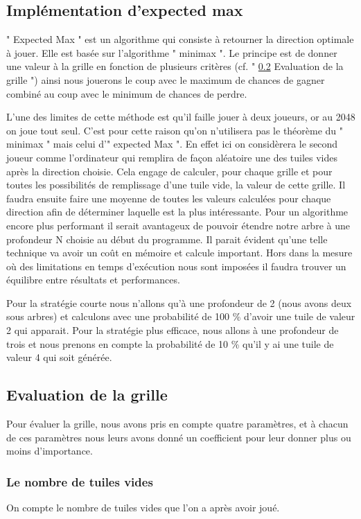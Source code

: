 \documentclass[12pt]{article}
\begin{document}
\subsection{Implémentation d'expected max}
" Expected Max " est un algorithme qui consiste à retourner la direction
optimale à jouer. Elle est basée sur l'algorithme " minimax ". Le
principe est de donner une valeur à la grille en fonction de plusieurs critères
(cf. " \ref{eval_grid} Evaluation de la grille ") ainsi nous jouerons le
coup avec le maximum de chances de gagner combiné au coup avec le minimum de
chances de perdre.
\par L'une des limites de cette méthode est qu'il faille jouer à deux
joueurs, or au 2048 on joue tout seul. C'est pour cette raison qu'on n'utilisera
pas le théorème du " minimax " mais celui d'" expected Max ". En effet
ici on considèrera le second joueur comme l'ordinateur qui remplira de façon
aléatoire une des tuiles vides après la direction choisie. Cela engage de
calculer, pour chaque grille et pour toutes les possibilités de remplissage
d'une tuile vide, la valeur de cette grille. Il faudra ensuite faire une moyenne
de toutes les valeurs calculées pour chaque direction afin de déterminer
laquelle est la plus intéressante. Pour un algorithme encore plus performant il serait
avantageux de pouvoir étendre notre arbre à une profondeur N choisie au
début du programme. Il parait évident qu'une telle technique va avoir un coût
en mémoire et calcule important. Hors dans la mesure où des limitations en temps
d'exécution nous sont imposées il faudra trouver un équilibre entre résultats et
performances.
\par Pour la stratégie courte nous n'allons qu'à une profondeur de 2 (nous
avons deux sous arbres) et calculons avec une probabilité de 100 \%
d'avoir une tuile de valeur 2 qui apparait. Pour la stratégie plus
efficace, nous allons à une profondeur de trois et nous prenons en compte
la probabilité de 10 \% qu'il y ai une tuile de valeur 4 qui soit
générée.

\subsection{Evaluation de la grille}
\label{eval_grid}
Pour évaluer la grille, nous avons pris en compte quatre paramètres, et à chacun
de ces paramètres nous leurs avons donné un coefficient pour leur donner plus ou
moins d'importance. \cite{Eval}

\subsubsection{Le nombre de tuiles vides}
On compte le nombre de tuiles vides que l'on a après avoir joué.
\end{document}
